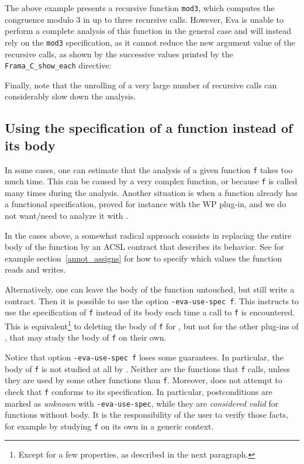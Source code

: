 \documentclass{frama-c-book}
\begin{document}

The above example presents a recursive function \lstinline|mod3|, which
computes the congruence modulo 3 in up to three recursive calls.
However, Eva is unable to perform a complete analysis of this function
in the general case and will instead rely on the \lstinline|mod3| specification,
as it cannot reduce the new argument value of the recursive calls, as shown
by the successive values printed by the \lstinline|Frama_C_show_each| directive:


Finally, note that the unrolling of a very large number of recursive calls can
considerably slow down the analysis.


\subsection{Using the specification of a function instead of its body}
\label{val-use-spec}

In some cases, one can estimate that the analysis of a given function \verb+f+
takes too much time. This can be caused by a very complex
function, or because \verb+f+ is called many times during the analysis.
Another situation is when a function already has a functional specification,
proved for instance with the \textsf{WP} plug-in, and we do not want/need
to analyze it with \Eva{}.

In the cases above, a somewhat radical
approach consists in replacing the entire body of the function
by an ACSL contract that describes its behavior. See for example
section~\ref{annot_assigns} for how to specify which values the function
reads and writes.

Alternatively, one can leave the body of the function untouched, but
still write a contract. Then it is possible to use the option
\verb+-eva-use-spec f+. This instructs \Eva{} to use the
specification of \verb+f+ instead of its body each time a call to
\verb+f+ is encountered. This is equivalent\footnote{Except for a few
  properties, as described in the next paragraph.} to deleting the body
of \verb+f+ for \Eva{}, but not for the other plug-ins of \FramaC,
that may study the body of \verb+f+ on their own.

Notice that option \verb+-eva-use-spec f+ loses some guarantees. In particular,
the body of \verb+f+ is not studied at all by \Eva{}. Neither
are the functions that \verb+f+ calls, unless they are used by some other
functions than \verb+f+. Moreover, \Eva{} does not attempt
to check that \verb+f+ conforms to its specification. In particular,
postconditions are marked as {\em unknown} with \verb+-eva-use-spec+,
while they are {\em considered valid} for functions without body.
It is the responsibility
of the user to verify those facts, for example by studying \verb+f+
on its own in a generic context.
\end{document}
